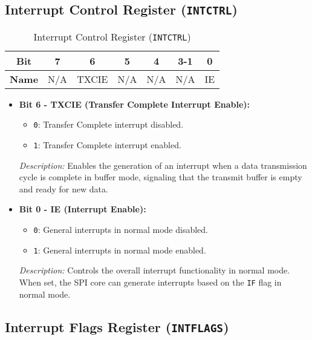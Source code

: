   \subsection{Interrupt Control Register (\texttt{INTCTRL})}
  \label{sec:intctrl}
  
  \begin{table}[H]
      \centering
      \caption{Interrupt Control Register (\texttt{INTCTRL})}
      \begin{tabular}{@{}ccccccc@{}}
          \toprule
          \textbf{Bit} & 7 & 6 & 5 & 4 & 3-1 & 0 \\ \midrule
          \textbf{Name} & N/A & TXCIE & N/A & N/A & N/A & IE \\ \bottomrule
      \end{tabular}
      \label{tab:intctrl}
  \end{table}
  
  \begin{itemize}
      
      \item \textbf{Bit 6 - TXCIE (Transfer Complete Interrupt Enable):} 
      \begin{itemize}
          \item \texttt{0}: Transfer Complete interrupt disabled.
          \item \texttt{1}: Transfer Complete interrupt enabled.
      \end{itemize}
      \textit{Description:} Enables the generation of an interrupt when a data transmission cycle is complete in buffer mode, signaling that the transmit buffer is empty and ready for new data.
      
      \item \textbf{Bit 0 - IE (Interrupt Enable):} 
      \begin{itemize}
          \item \texttt{0}: General interrupts in normal mode disabled.
          \item \texttt{1}: General interrupts in normal mode enabled.
      \end{itemize}
      \textit{Description:} Controls the overall interrupt functionality in normal mode. When set, the SPI core can generate interrupts based on the \texttt{IF} flag in normal mode.
  \end{itemize}
  
  \subsection{Interrupt Flags Register (\texttt{INTFLAGS})}
  \label{sec:intflags}
  

